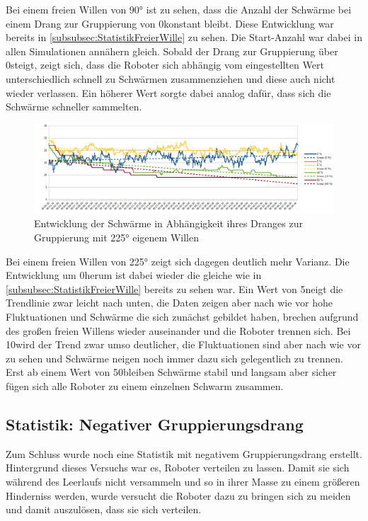 Bei einem freien Willen von 90° ist zu sehen, dass die Anzahl der Schwärme bei einem Drang zur Gruppierung von 0\per konstant bleibt. Diese Entwicklung war bereits in \autoref{subsubsec:StatistikFreierWille} zu sehen. Die Start-Anzahl war dabei in allen Simulationen annähern gleich.
Sobald der Drang zur Gruppierung über 0\per steigt, zeigt sich, dass die Roboter sich abhängig vom eingestellten Wert unterschiedlich schnell zu Schwärmen zusammenziehen und diese auch nicht wieder verlassen. Ein höherer Wert sorgte dabei analog dafür, dass sich die Schwärme schneller sammelten.

\begin{figure}
	\includegraphics[width=\textwidth, height=\statisticHeight]{graphics/Statistics/FlockGeneral/LocalRange1Speed01FreeWill225.png}
	\caption{Entwicklung der Schwärme in Abhängigkeit ihres Dranges zur Gruppierung mit 225° eigenem Willen}
	\label{pic:GeneralFlockStatistic3}
\end{figure}

Bei einem freien Willen von 225° zeigt sich dagegen deutlich mehr Varianz. Die Entwicklung um 0\per herum ist dabei wieder die gleiche wie in \autoref{subsubsec:StatistikFreierWille} bereits zu sehen war. Ein Wert von 5\per neigt die Trendlinie zwar leicht nach unten, die Daten zeigen aber nach wie vor hohe Fluktuationen und Schwärme die sich zunächst gebildet haben, brechen aufgrund des großen freien Willens wieder auseinander und die Roboter trennen sich. Bei 10\per wird der Trend zwar umso deutlicher, die Fluktuationen sind aber nach wie vor zu sehen und Schwärme neigen noch immer dazu sich gelegentlich zu trennen. Erst ab einem Wert von 50\per bleiben Schwärme stabil und langsam aber sicher fügen sich alle Roboter zu einem einzelnen Schwarm zusammen.

\subsection*{Statistik: Negativer Gruppierungsdrang}

Zum Schluss wurde noch eine Statistik mit negativem Gruppierungsdrang erstellt. Hintergrund dieses Versuchs war es, Roboter verteilen zu lassen. Damit sie sich während des Leerlaufs nicht versammeln und so in ihrer Masse zu einem größeren Hinderniss werden, wurde versucht die Roboter dazu zu bringen sich zu meiden und damit auszulösen, dass sie sich verteilen.

